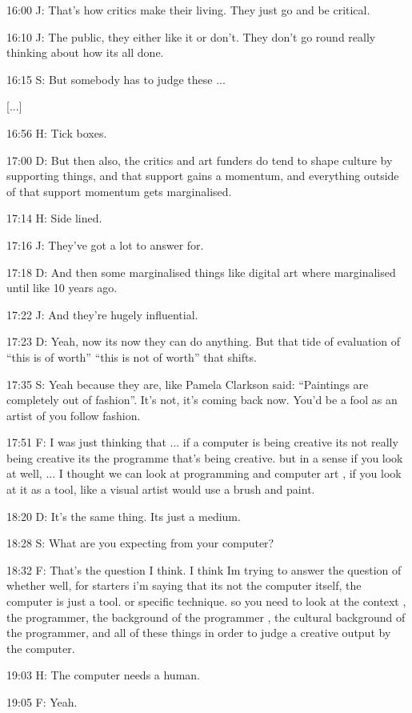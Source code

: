 16:00 J: That's how critics make their living. They just go and be critical.

16:10 J: The public, they either like it or don't. They don't go round really thinking about how its all done.

16:15 S: But somebody has to judge these ...

[...]

16:56 H: Tick boxes.

17:00 D: But then also, the critics and art funders do tend to shape culture by supporting things, and that support gains a momentum, and everything outside of that support momentum gets marginalised.

17:14 H: Side lined.

17:16 J: They've got a lot to answer for.

17:18 D: And then some marginalised things like digital art where marginalised until like 10 years ago.

17:22 J: And they're hugely influential.

17:23 D: Yeah, now its now they can do anything. But that tide of evaluation of ``this is of worth'' ``this is not of worth'' that shifts.

17:35 S: Yeah because they are, like Pamela Clarkson said: ``Paintings are completely out of fashion''. It's not, it's coming back now. You'd be a fool as an artist of you follow fashion.

17:51 F: I was just thinking that ... if a computer is being creative its not really being creative its the programme that's being creative. but in a sense if you look at well, ... I thought we can look at programming and computer art , if you look at it as a tool, like a visual artist would use a brush and paint.

18:20 D: It's the same thing. Its just a medium.

18:28 S: What are you expecting from your computer?

18:32 F: That's the question I think. I think Im trying to answer the question of whether well, for starters i'm saying that its not the computer itself, the computer is just a tool. or specific technique. so you need to look at the context , the programmer, the background of the programmer , the cultural background of the programmer, and all of these things in order to judge a creative output by the computer.

19:03 H: The computer needs a human.

19:05 F: Yeah.

